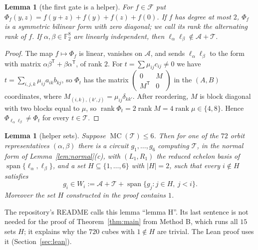 \documentclass[11pt,a4paper]{article}
\newtheorem{lemma}[theorem]{Lemma}
\theoremstyle{definition}
\newcommand{\F}{\mathbb{F}}
\newcommand{\Fn}{\mathcal{F}}
\newcommand{\Aff}{\mathcal{A}}
\newcommand{\Tg}{\mathcal{T}}
\newcommand{\MC}{\operatorname{MC}}
\newcommand{\spn}{\operatorname{span}}
\begin{document}
\begin{lemma}[the first gate is a helper]\label{lem:first}
For $f\in\Fn$ put $\Phi_f(y,z)=f(y+z)+f(y)+f(z)+f(0)$. If $f$ has degree at most $2$, $\Phi_f$ is a symmetric bilinear form with zero diagonal; we call its rank the \emph{alternating rank} of $f$. If $\alpha,\beta\in\F_2^8$ are linearly independent, then $\ell_\alpha\ell_\beta\notin\Aff+\Tg$.
\end{lemma}

\begin{proof}
The map $f\mapsto \Phi_f$ is linear, vanishes on $\Aff$, and sends $\ell_\alpha\ell_\beta$ to the form with matrix $\alpha\beta^{\mathsf T}+\beta\alpha^{\mathsf T}$, of rank $2$. For $t=\sum\mu_{ij}c_{ij}\ne0$ we have $t=\sum_{i,j,k}\mu_{ij}a_{ik}b_{kj}$, so $\Phi_t$ has the matrix $\begin{pmatrix}0&M\\M^{\mathsf T}&0\end{pmatrix}$ in the $(A,B)$ coordinates, where $M_{(i,k),(k',j)}=\mu_{ij}\delta_{kk'}$. After reordering, $M$ is block diagonal with two blocks equal to $\mu$, so $\operatorname{rank}\Phi_t=2\operatorname{rank}M=4\operatorname{rank}\mu\in\{4,8\}$. Hence $\Phi_{\ell_\alpha\ell_\beta}\neq \Phi_t$ for every $t\in\Tg$.
\end{proof}

\begin{lemma}[helper sets]\label{lem:helpers}
Suppose $\MC(\Tg)\le 6$. Then for one of the $72$ orbit representatives $(\alpha,\beta)$ there is a circuit $g_1,\dots,g_6$ computing $\Tg$, in the normal form of Lemma~\ref{lem:normal}(c), with $(L_1,R_1)$ the reduced echelon basis of $\spn\{\ell_\alpha,\ell_\beta\}$, and a set $H\subseteq\{1,\dots,6\}$ with $|H|=2$, such that every $i\notin H$ satisfies
\[
g_i\in W_i:=\Aff+\Tg+\spn\{g_j: j\in H,\ j<i\}.
\]
Moreover the set $H$ constructed in the proof contains $1$.
\end{lemma}

The repository's README calls this lemma ``lemma H''. Its last sentence is not needed for the proof of Theorem~\ref{thm:main} from Method B, which runs all $15$ sets $H$; it explains why the $720$ cubes with $1\notin H$ are trivial. The Lean proof uses it (Section~\ref{sec:lean}).
\end{document}
